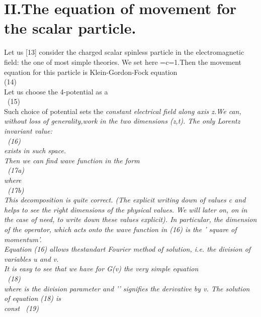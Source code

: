 \documentclass[a4paper,12pt] {article}
\begin{document}
\section *{II.The equation of movement for the scalar particle.}
Let us [13] consider the charged scalar spinless particle in the electromagnetic field: the one of most
 simple  theories. We  set here  \myHighlight{$\hbar $}\coordHE{}=c=1.Then the movement equation for this  particle is
 Klein-Gordon-Fock equation
\\\coordHE{} (14)
\\ Let us choose the 4-potential \coordHE{} as a \\ \coordHE{}  \ (15)
 \\ Such choice of potential sets the \it constant electrical field along axis z.\rm We can, without loss of
 generality,work in the two dimensions (z,t). The only Lorentz invariant value:\\\coordHE{} \ (16)
\\
exists in such space. \\Then we can find  wave function \coordHE{} in the form \\\coordHE{} \ (17a)
\\where \\\coordHE{} \ (17b) \\ This decomposition is quite correct.
(The explicit writing down of values c and \myHighlight{$\hbar$}\coordHE{} helps to see the right dimensions of the  physical values. We will later on, on in the
 case of need, to write down these values explicit).
In particular, the  dimension of  the operator, which acts onto the wave function in (16) is the \it ' square
of momentum'.\\ \rm  Equation  (16)  allows the\it standart Fourier method \rm of solution, i.e. the division of
variables u and v.
\\ It is easy to see that we have for  G(v) the very simple   equation \\\coordHE{} \ (18)
\\ where
 \myHighlight{$\lambda$}\coordHE{}  is the \it division parameter \rm and '\coordHE{}' signifies the derivative by v. The solution of
equation  (18) is \\\coordHE{} const \coordHE{} \  (19)
\end{document}
